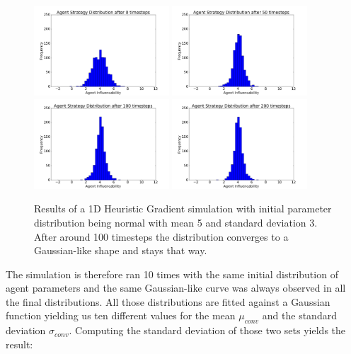 \documentclass[11pt]{article}
\begin{document}
\begin{figure}
  \centering
  \quad
  \includegraphics[width=0.45\textwidth]{figures/convergence_example_1.png}
  \includegraphics[width=0.45\textwidth]{figures/convergence_example_2.png}
  \includegraphics[width=0.45\textwidth]{figures/convergence_example_3.png}
  \includegraphics[width=0.45\textwidth]{figures/convergence_example_4.png}
  \caption[Convergence Example]{Results of a 1D Heuristic Gradient simulation with initial parameter distribution being normal with mean 5 and standard deviation 3. After around 100 timesteps the distribution converges to a Gaussian-like shape and stays that way.}
  \label{fig:convergenceexample}
\end{figure}
The simulation is therefore ran 10 times with the same initial distribution of agent parameters and the same Gaussian-like curve was always observed in all the final distributions. All those distributions are fitted against a Gaussian function yielding us ten different values for the mean $\mu_{conv}$ and the standard deviation $\sigma_{conv}$. Computing the standard deviation of those two sets yields the result:
\end{document}
